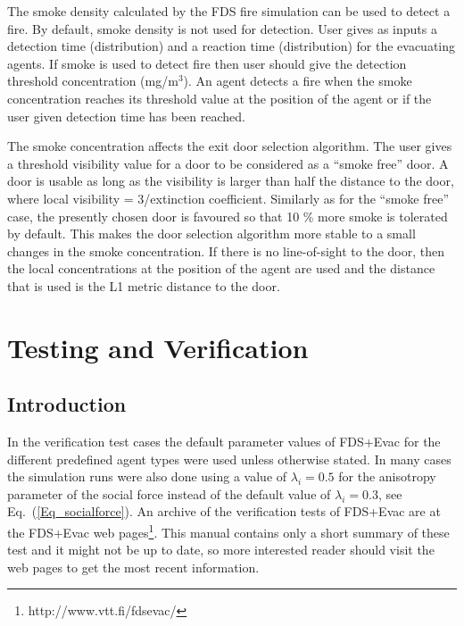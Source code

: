 \documentclass[12pt,a4paper,final,twoside]{stylevk}
\begin{document}
The smoke density calculated by the FDS fire simulation can be used to
detect a fire.  By default, smoke density is not used for detection.
User gives as inputs a detection time (distribution) and a reaction
time (distribution) for the evacuating agents.  If smoke is used to
detect fire then user should give the detection threshold
concentration (mg/m${}^3$).  An agent detects a fire when the smoke
concentration reaches its threshold value at the position of the agent
or if the user given detection time has been reached.


The smoke concentration affects the exit door selection algorithm.
The user gives a threshold visibility value for a door to be
considered as a ``smoke free'' door.  A door is usable as long as the
visibility is larger than half the distance to the door, where local
visibility = 3/extinction coefficient.  Similarly as for the ``smoke
free'' case, the presently chosen door is favoured so that 10 \% more
smoke is tolerated by default.  This makes the door selection
algorithm more stable to a small changes in the smoke concentration.
If there is no line-of-sight to the door, then the local
concentrations at the position of the agent are used and the distance
that is used is the L1 metric distance to the door.



\clearpage

\newpage


\chapter{Testing and Verification}\label{Sec_TestVerif}


\vspace{\fill}

\section{Introduction}

\vspace{\fill}

\noindent In the verification test cases the default parameter values
of FDS+Evac for the different predefined agent types were used unless
otherwise stated.  In many cases the simulation runs were also done
using a value of $\lambda_i=0.5$ for the anisotropy parameter of the
social force instead of the default value of $\lambda_i=0.3$, see
Eq.~(\ref{Eq_socialforce}).  An archive of the verification tests of
FDS+Evac are at the FDS+Evac web
pages\footnote{http://www.vtt.fi/fdsevac/}.  This manual contains only
a short summary of these test and it might not be up to date, so more
interested reader should visit the web pages to get the most recent
information.
\end{document}
